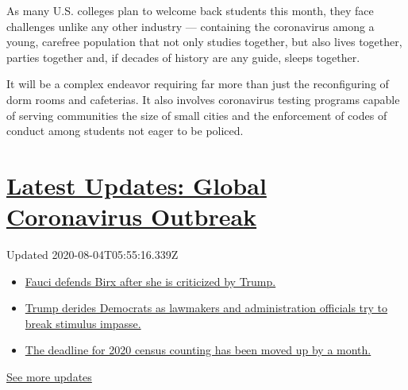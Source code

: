 As many U.S. colleges plan to welcome back students this month, they
face challenges unlike any other industry --- containing the coronavirus
among a young, carefree population that not only studies together, but
also lives together, parties together and, if decades of history are any
guide, sleeps together.

It will be a complex endeavor requiring far more than just the
reconfiguring of dorm rooms and cafeterias. It also involves coronavirus
testing programs capable of serving communities the size of small cities
and the enforcement of codes of conduct among students not eager to be
policed.

\hypertarget{latest-updates-global-coronavirus-outbreak}{%
\section{\texorpdfstring{\href{https://www.nytimes.com/2020/08/03/world/coronavirus-covid-19.html?action=click\&pgtype=Article\&state=default\&region=MAIN_CONTENT_1\&context=storylines_live_updates}{Latest
Updates: Global Coronavirus
Outbreak}}{Latest Updates: Global Coronavirus Outbreak}}\label{latest-updates-global-coronavirus-outbreak}}

Updated 2020-08-04T05:55:16.339Z

\begin{itemize}
\tightlist
\item
  \href{https://www.nytimes.com/2020/08/03/world/coronavirus-covid-19.html?action=click\&pgtype=Article\&state=default\&region=MAIN_CONTENT_1\&context=storylines_live_updates\#link-4547638f}{Fauci
  defends Birx after she is criticized by Trump.}
\item
  \href{https://www.nytimes.com/2020/08/03/world/coronavirus-covid-19.html?action=click\&pgtype=Article\&state=default\&region=MAIN_CONTENT_1\&context=storylines_live_updates\#link-15e7f995}{Trump
  derides Democrats as lawmakers and administration officials try to
  break stimulus impasse.}
\item
  \href{https://www.nytimes.com/2020/08/03/world/coronavirus-covid-19.html?action=click\&pgtype=Article\&state=default\&region=MAIN_CONTENT_1\&context=storylines_live_updates\#link-e5a2cda}{The
  deadline for 2020 census counting has been moved up by a month.}
\end{itemize}

\href{https://www.nytimes.com/2020/08/03/world/coronavirus-covid-19.html?action=click\&pgtype=Article\&state=default\&region=MAIN_CONTENT_1\&context=storylines_live_updates}{See
more updates}

